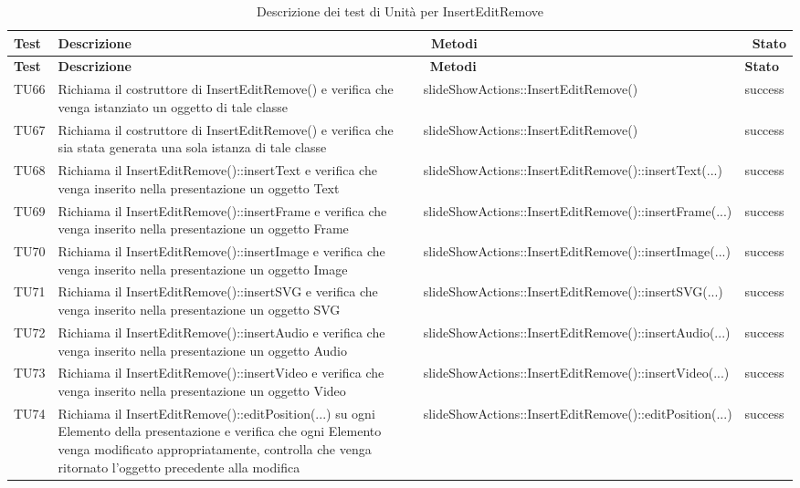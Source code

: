 		  		   \begin{longtable} [c]{| p{2cm} | p{6cm} |p{3cm} | p{2cm} |}
		 		 	 						\caption{Descrizione dei test di Unità per InsertEditRemove \label{tab:verTestUnit}}\\
		 	  		 \hline
		 	  		 \textbf{Test} & \textbf{Descrizione} & \ \textbf{Metodi} & \ \textbf{Stato} \\
		 	  		 \hline
		 	  		 \endfirsthead
		 	  		 \hline
		 	  		 \textbf{Test} & \textbf{Descrizione} & \ \textbf{Metodi} & \textbf{Stato} \\
		 	  		 \hline
		 		 	 						\endhead
		 	  		 \hline
		 	  		 \endfoot
		 	  		 \hline
		 	  		 \endlastfoot
		  		 TU66 & Richiama il costruttore di InsertEditRemove() e verifica che venga istanziato un oggetto di tale classe  & slideShowActions::InsertEditRemove() & success \\
		  		 TU67 & Richiama il costruttore di InsertEditRemove() e verifica che sia stata generata una sola istanza di tale classe  & slideShowActions::InsertEditRemove() & success \\
		 		 TU68 & Richiama il InsertEditRemove()::insertText e verifica che venga inserito nella presentazione un oggetto Text & slideShowActions::InsertEditRemove()::insertText(...) & success \\
		 		 TU69 & Richiama il InsertEditRemove()::insertFrame e verifica che venga inserito nella presentazione un oggetto Frame\ped{g}  & slideShowActions::InsertEditRemove()::insertFrame(...) & success \\
		 		 TU70 & Richiama il InsertEditRemove()::insertImage e verifica che venga inserito nella presentazione un oggetto Image  & slideShowActions::InsertEditRemove()::insertImage(...) & success \\
		 		 TU71 & Richiama il InsertEditRemove()::insertSVG e verifica che venga inserito nella presentazione un oggetto SVG  & slideShowActions::InsertEditRemove()::insertSVG(...) & success \\
		 		 TU72 & Richiama il InsertEditRemove()::insertAudio e verifica che venga inserito nella presentazione un oggetto Audio  & slideShowActions::InsertEditRemove()::insertAudio(...) & success \\
		 		 TU73 & Richiama il InsertEditRemove()::insertVideo e verifica che venga inserito nella presentazione un oggetto Video  & slideShowActions::InsertEditRemove()::insertVideo(...) & success \\
		 		 TU74 & Richiama il InsertEditRemove()::editPosition(...) su ogni Elemento\ped{g} della presentazione e verifica che ogni Elemento\ped{g} venga modificato appropriatamente, controlla che venga ritornato l'oggetto precedente alla modifica   & slideShowActions::InsertEditRemove()::editPosition(...) & success \\

\end{longtable}
